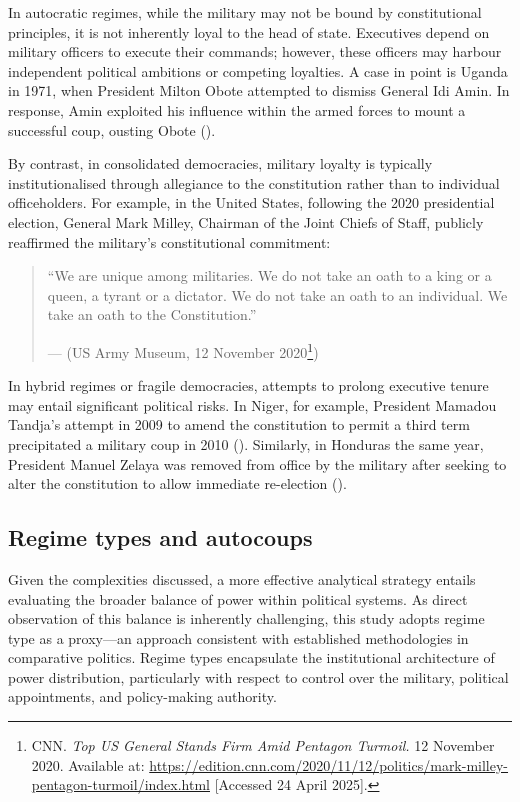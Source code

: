 \documentclass[
  12pt,
]{report}
\begin{document}
In autocratic regimes, while the military may not be bound by
constitutional principles, it is not inherently loyal to the head of
state. Executives depend on military officers to execute their commands;
however, these officers may harbour independent political ambitions or
competing loyalties. A case in point is Uganda in 1971, when President
Milton Obote attempted to dismiss General Idi Amin. In response, Amin
exploited his influence within the armed forces to mount a successful
coup, ousting Obote ().

By contrast, in consolidated democracies, military loyalty is typically
institutionalised through allegiance to the constitution rather than to
individual officeholders. For example, in the United States, following
the 2020 presidential election, General Mark Milley, Chairman of the
Joint Chiefs of Staff, publicly reaffirmed the military's constitutional
commitment:

\begin{quote}
``We are unique among militaries. We do not take an oath to a king or a
queen, a tyrant or a dictator. We do not take an oath to an individual.
We take an oath to the Constitution.''

--- (US Army Museum, 12 November 2020\footnote{CNN. \emph{Top US General
  Stands Firm Amid Pentagon Turmoil.} 12 November 2020. Available at:
  \url{https://edition.cnn.com/2020/11/12/politics/mark-milley-pentagon-turmoil/index.html}
  {[}Accessed 24 April 2025{]}.})
\end{quote}

In hybrid regimes or fragile democracies, attempts to prolong executive
tenure may entail significant political risks. In Niger, for example,
President Mamadou Tandja's attempt in 2009 to amend the constitution to
permit a third term precipitated a military coup in 2010
(). Similarly, in Honduras the
same year, President Manuel Zelaya was removed from office by the
military after seeking to alter the constitution to allow immediate
re-election ().

\subsection*{Regime types and
autocoups}\label{regime-types-and-autocoups}

Given the complexities discussed, a more effective analytical strategy
entails evaluating the broader balance of power within political
systems. As direct observation of this balance is inherently
challenging, this study adopts regime type as a proxy---an approach
consistent with established methodologies in comparative politics.
Regime types encapsulate the institutional architecture of power
distribution, particularly with respect to control over the military,
political appointments, and policy-making authority.
\end{document}
